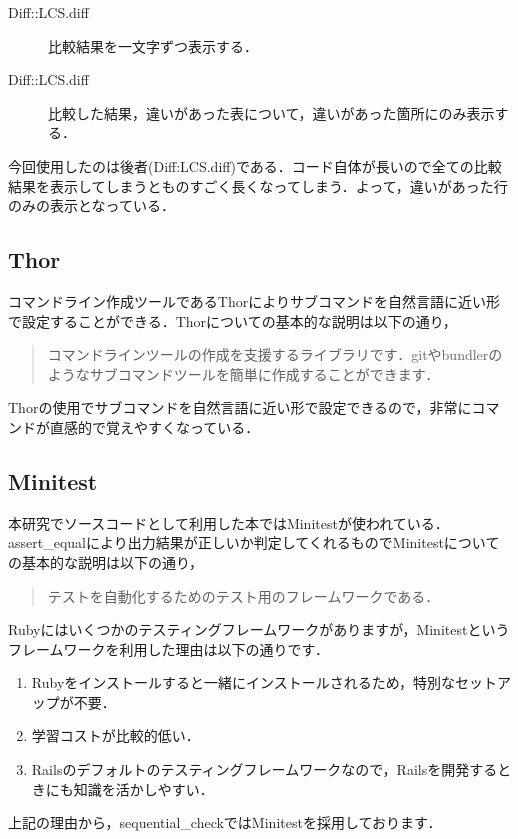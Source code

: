 \begin{description}
\item[Diff::LCS.diff]
比較結果を一文字ずつ表示する．
\item[Diff::LCS.diff]
比較した結果，違いがあった表について，違いがあった箇所にのみ表示する．
\end{description}

今回使用したのは後者(Diff:LCS.diff)である．コード自体が長いので全ての比較結果を表示してしまうとものすごく長くなってしまう．よって，違いがあった行のみの表示となっている．

    \subsection{Thor}\label{thor}

    コマンドライン作成ツールであるThorによりサブコマンドを自然言語に近い形で設定することができる．Thorについての基本的な説明は以下の通り，
\begin{quotation}
コマンドラインツールの作成を支援するライブラリです．gitやbundlerのようなサブコマンドツールを簡単に作成することができます． \cite{thor}
\end{quotation}
Thorの使用でサブコマンドを自然言語に近い形で設定できるので，非常にコマンドが直感的で覚えやすくなっている．

    \subsection{Minitest}\label{minitest}

    本研究でソースコードとして利用した本ではMinitestが使われている．assert\_equalにより出力結果が正しいか判定してくれるものでMinitestについての基本的な説明は以下の通り，
\begin{quotation} 
テストを自動化するためのテスト用のフレームワークである．\cite{rails}
\end{quotation}
Rubyにはいくつかのテスティングフレームワークがありますが，Minitestというフレームワークを利用した理由は以下の通りです．

\begin{enumerate}
\def\labelenumi{\arabic{enumi}.}
\tightlist
\item
  Rubyをインストールすると一緒にインストールされるため，特別なセットアップが不要．
\item
  学習コストが比較的低い．
\item
  Railsのデフォルトのテスティングフレームワークなので，Railsを開発するときにも知識を活かしやすい．
\end{enumerate}
上記の理由から，sequential\_checkではMinitestを採用しております．

